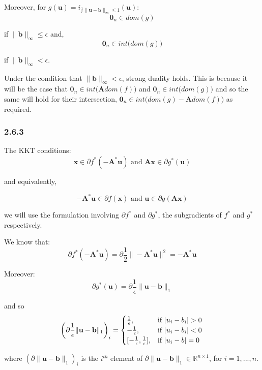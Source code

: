 \documentclass[12pt]{article}
\begin{document}
Moreover, for $g(\textbf{u}) =  i_{\frac{1}{\epsilon}\|\textbf{u} - \textbf{b}\|_{\infty} \leq 1}\left(\textbf{u}\right)$:
\[\textbf{0}_n \in dom(g)\]

if $\|\textbf{b}\|_{\infty} \leq \epsilon$ and,
\[\textbf{0}_n \in int \big(dom(g)\big)\]

if $\|\textbf{b}\|_{\infty} < \epsilon$.

Under the condition that $\|\textbf{b}\|_{\infty} < \epsilon$, strong duality holds. This is because it will be the case that $\textbf{0}_n \in int \big(\textbf{A} dom(f)\big)$ and $\textbf{0}_n \in int \big(dom(g)\big)$ and so the same will hold for their intersection, $\textbf{0}_n \in int \big(dom(g) - \textbf{A}dom(f)\big)$ as required.

\subsubsection*{2.6.3}

The KKT conditions:
\[\textbf{x} \in \partial f^*(-\textbf{A}^*\textbf{u}) \text{ and } \textbf{Ax} \in \partial g^*(\textbf{u})\]

and equivalently,

\[-\textbf{A}^*\textbf{u} \in \partial f(\textbf{x}) \text{ and } \textbf{u} \in \partial g(\textbf{Ax})\]


we will use the formulation involving $\partial f^*$ and $\partial g^*$, the subgradients of $f^*$ and $g^*$ respectively.

We know that:
\[\partial f^*(-\textbf{A}^*\textbf{u}) = \partial \frac{1}{2}\|-\textbf{A}^*\textbf{u}\|^2 = -\textbf{A}^*\textbf{u}\]

Moreover:
\[\partial g^*(\textbf{u}) = \partial\frac{1}{\epsilon} \| \textbf{u} - \textbf{b}\|_1 \]

and so
\[\left(\partial \frac{1}{\epsilon}\| \textbf{u} - \textbf{b}\|_1\right)_i = \begin{cases}
      \frac{1}{\epsilon}, &  \text{if } | u_i - b_i| > 0 \\
      -\frac{1}{\epsilon}, &  \text{if } | u_i - b_i| < 0 \\
      [-\frac{1}{\epsilon}, \frac{1}{\epsilon}], &  \text{if } | u_i - b| = 0 \\
   \end{cases} \\
\]

where $\left(\partial\| \textbf{u} - \textbf{b}\|_1\right)_i$ is the $i^{th}$ element of $\partial\| \textbf{u} - \textbf{b}\|_1 \in \mathbb{R}^{n \times 1}$, for $i=1, ..., n$.
\end{document}
